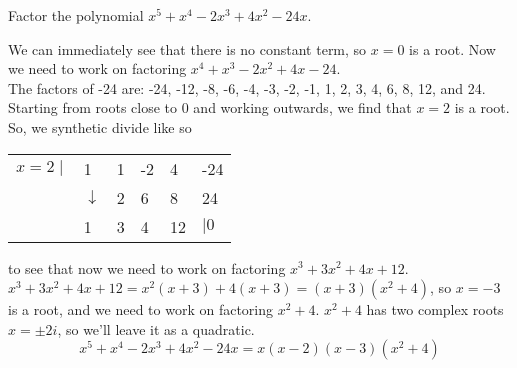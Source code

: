 \begin{example}
Factor the polynomial $x^5 + x^4 -2x^3 + 4x^2 -24x$.	
\end{example}
\begin{answer}
	We can immediately see that there is no constant term, so $x=0$ is a root. Now we need to work on factoring $x^4 + x^3 -2x^2 + 4x - 24$.\\
	The factors of -24 are: -24, -12, -8, -6, -4, -3, -2, -1, 1, 2, 3, 4, 6, 8, 12, and 24. Starting from roots close to 0 and working outwards, we find that $x=2$ is a root. So, we synthetic divide like so
	\begin{table}[H]
		\centering
		\begin{tabular}{llllll}
			$x=2 \mid$ & 1            & 1 & -2 & 4  & -24 \\
			& $\downarrow$ & 2 & 6  & 8  & 24  \\ \hline
			& 1            & 3 & 4  & 12 & $\mid 0$  
		\end{tabular}
	\end{table}
	
	to see that now we need to work on factoring $x^3+3x^2+4x+12$.
	$x^3+3x^2+4x+12 = x^2(x+3)+4(x+3) = (x+3)(x^2+4)$, so $x=-3$ is a root, and we need to work on factoring $x^2+4$.
	$x^2+4$ has two complex roots $x = \pm 2i$, so we'll leave it as a quadratic.
	\begin{equation*}	
		x^5 + x^4 -2x^3 + 4x^2 -24x = x(x-2)(x-3)(x^2+4)
	\end{equation*}
\end{answer}